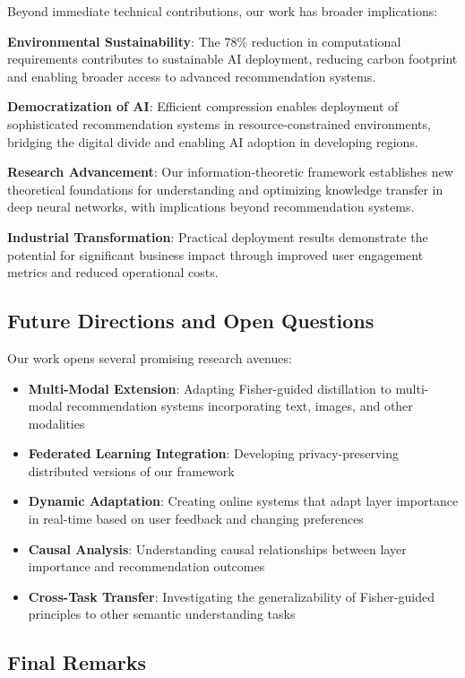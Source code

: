 \documentclass[10pt,conference]{IEEEtran}
\begin{document}
Beyond immediate technical contributions, our work has broader implications:

\textbf{Environmental Sustainability}: The 78\% reduction in computational requirements contributes to sustainable AI deployment, reducing carbon footprint and enabling broader access to advanced recommendation systems.

\textbf{Democratization of AI}: Efficient compression enables deployment of sophisticated recommendation systems in resource-constrained environments, bridging the digital divide and enabling AI adoption in developing regions.

\textbf{Research Advancement}: Our information-theoretic framework establishes new theoretical foundations for understanding and optimizing knowledge transfer in deep neural networks, with implications beyond recommendation systems.

\textbf{Industrial Transformation}: Practical deployment results demonstrate the potential for significant business impact through improved user engagement metrics and reduced operational costs.

\subsection{Future Directions and Open Questions}

Our work opens several promising research avenues:

\begin{itemize}[leftmargin=*]
    \item \textbf{Multi-Modal Extension}: Adapting Fisher-guided distillation to multi-modal recommendation systems incorporating text, images, and other modalities
    \item \textbf{Federated Learning Integration}: Developing privacy-preserving distributed versions of our framework
    \item \textbf{Dynamic Adaptation}: Creating online systems that adapt layer importance in real-time based on user feedback and changing preferences
    \item \textbf{Causal Analysis}: Understanding causal relationships between layer importance and recommendation outcomes
    \item \textbf{Cross-Task Transfer}: Investigating the generalizability of Fisher-guided principles to other semantic understanding tasks
\end{itemize}

\subsection{Final Remarks}
\end{document}
